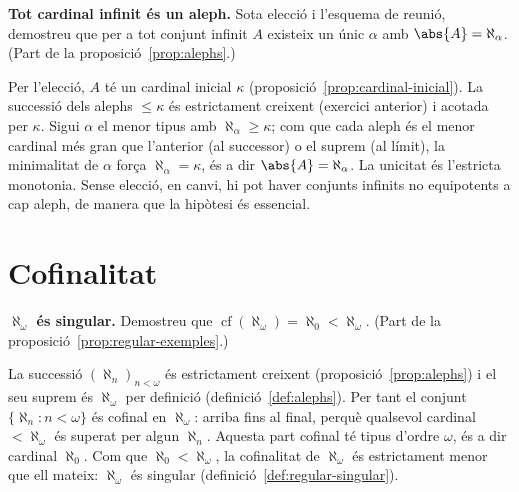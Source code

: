 \begin{exercici}
\textbf{Tot cardinal infinit és un aleph.} Sota elecció i l'esquema de reunió, demostreu que per a tot conjunt infinit \(A\) existeix un únic \(\alpha\) amb \(\abs{A}=\aleph_\alpha\). (Part de la proposició~\ref{prop:alephs}.)
\end{exercici}
\begin{solucio}
Per l'elecció, \(A\) té un cardinal inicial \(\kappa\) (proposició~\ref{prop:cardinal-inicial}). La successió dels alephs \(\le\kappa\) és estrictament creixent (exercici anterior) i acotada per \(\kappa\). Sigui \(\alpha\) el menor tipus amb \(\aleph_\alpha\ge\kappa\); com que cada aleph és el menor cardinal més gran que l'anterior (al successor) o el suprem (al límit), la minimalitat de \(\alpha\) força \(\aleph_\alpha=\kappa\), és a dir \(\abs{A}=\aleph_\alpha\). La unicitat és l'estricta monotonia. Sense elecció, en canvi, hi pot haver conjunts infinits no equipotents a cap aleph, de manera que la hipòtesi és essencial.
\end{solucio}

\section{Cofinalitat}\label{prac:cofinalitat}

\begin{exercici}
\textbf{\(\aleph_\omega\) és singular.} Demostreu que \(\operatorname{cf}(\aleph_\omega)=\aleph_0<\aleph_\omega\). (Part de la proposició~\ref{prop:regular-exemples}.)
\end{exercici}
\begin{solucio}
La successió \((\aleph_n)_{n<\omega}\) és estrictament creixent (proposició~\ref{prop:alephs}) i el seu suprem és \(\aleph_\omega\) per definició (definició~\ref{def:alephs}). Per tant el conjunt \(\{\aleph_n:n<\omega\}\) és cofinal en \(\aleph_\omega\): arriba fins al final, perquè qualsevol cardinal \(<\aleph_\omega\) és superat per algun \(\aleph_n\). Aquesta part cofinal té tipus d'ordre \(\omega\), és a dir cardinal \(\aleph_0\). Com que \(\aleph_0<\aleph_\omega\), la cofinalitat de \(\aleph_\omega\) és estrictament menor que ell mateix: \(\aleph_\omega\) és singular (definició~\ref{def:regular-singular}).
\end{solucio}

